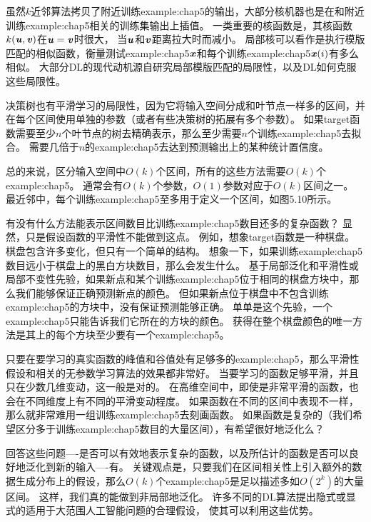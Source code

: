 虽然$k$近邻算法拷贝了附近训练\gls{example:chap5}的输出，大部分核机器也是在和附近训练\gls{example:chap5}相关的训练集输出上插值。
一类重要的核函数是，其核函数$k(\boldsymbol{\mathit{u}},\boldsymbol{\mathit{v}})$在$\boldsymbol{\mathit{u}}=\boldsymbol{\mathit{v}}$时很大，
当$\boldsymbol{\mathit{u}}$和$\boldsymbol{\mathit{v}}$距离拉大时而减小。
局部核可以看作是执行模版匹配的相似函数，衡量测试\gls{example:chap5}$\boldsymbol{\mathit{x}}$和每个训练\gls{example:chap5}$\boldsymbol{\mathit{x}}{(i)}$有多么相似。
大部分\gls{DL}的现代动机源自研究局部模版匹配的局限性，以及\gls{DL}如何克服这些局限性\citep{NIPS2005_424}。

决策树也有平滑学习的局限性，因为它将输入空间分成和叶节点一样多的区间，并在每个区间使用单独的参数（或者有些决策树的拓展有多个参数）。
如果\gls{target}函数需要至少$n$个叶节点的树去精确表示，那么至少需要$n$个训练\gls{example:chap5}去拟合。
需要几倍于$n$的\gls{example:chap5}去达到预测输出上的某种统计置信度。


总的来说，区分输入空间中$O(k)$个区间，所有的这些方法需要$O(k)$个\gls{example:chap5}。
通常会有$O(k)$个参数，$O(1)$参数对应于$O(k)$区间之一。
最近邻中，每个训练\gls{example:chap5}至多用于定义一个区间，如图5.10所示。

有没有什么方法能表示区间数目比训练\gls{example:chap5}数目还多的复杂函数？
显然，只是假设函数的平滑性不能做到这点。
例如，想象\gls{target}函数是一种棋盘。
棋盘包含许多变化，但只有一个简单的结构。
想象一下，如果训练\gls{example:chap5}数目远小于棋盘上的黑白方块数目，那么会发生什么。
基于局部泛化和平滑性或局部不变性先验，如果新点和某个训练\gls{example:chap5}位于相同的棋盘方块中，那么我们能够保证正确预测新点的颜色。
但如果新点位于棋盘中不包含训练\gls{example:chap5}的方块中，没有保证预测能够正确。
单单是这个先验，一个\gls{example:chap5}只能告诉我们它所在的方块的颜色。
获得在整个棋盘颜色的唯一方法是其上的每个方块至少要有一个\gls{example:chap5}。


只要在要学习的真实函数的峰值和谷值处有足够多的\gls{example:chap5}，那么平滑性假设和相关的无参数学习算法的效果都非常好。
当要学习的函数足够平滑，并且只在少数几维变动，这一般是对的。
在高维空间中，即使是非常平滑的函数，也会在不同维度上有不同的平滑变动程度。
如果函数在不同的区间中表现不一样，那么就非常难用一组训练\gls{example:chap5}去刻画函数。
如果函数是复杂的（我们希望区分多于训练\gls{example:chap5}数目的大量区间），有希望很好地泛化么？

回答这些问题----是否可以有效地表示复杂的函数，以及所估计的函数是否可以良好地泛化到新的输入----有。
关键观点是，只要我们在区间相关性上引入额外的数据生成分布上的假设，那么$O(k)$个\gls{example:chap5}是足以描述多如$O(2^k)$的大量区间。
这样，我们真的能做到非局部地泛化\citep{Bengio+Monperrus-2005,NIPS2005_539}。
许多不同的\gls{DL}算法提出隐式或显式的适用于大范围人工智能问题的合理假设， 使其可以利用这些优势。

